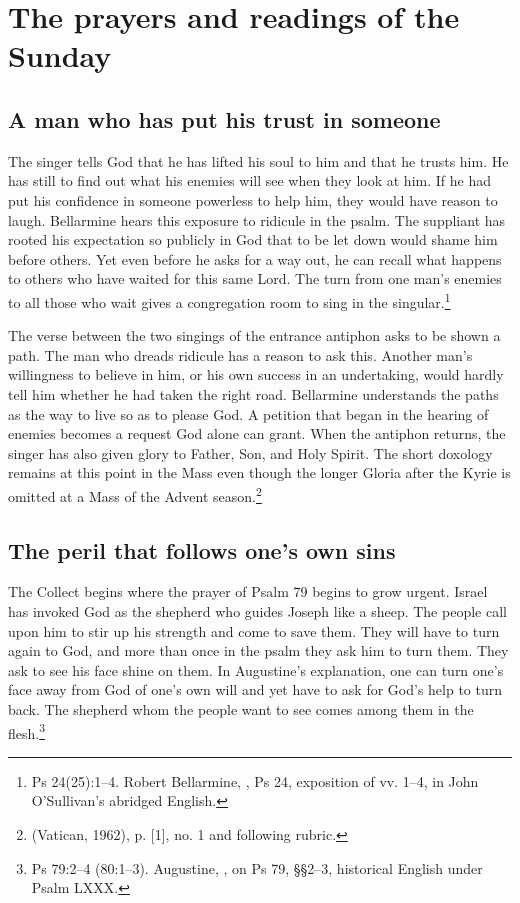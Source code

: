 \section{The prayers and readings of the Sunday}

\subsection{A man who has put his trust in someone}

The singer tells God that he has lifted his soul to him and that he trusts him. He has still to find out what his enemies will see when they look at him. If he had put his confidence in someone powerless to help him, they would have reason to laugh. Bellarmine hears this exposure to ridicule in the psalm. The suppliant has rooted his expectation so publicly in God that to be let down would shame him before others. Yet even before he asks for a way out, he can recall what happens to others who have waited for this same Lord. The turn from one man's enemies to all those who wait gives a congregation room to sing in the singular.\footnote{Ps 24(25):1--4. Robert Bellarmine, , Ps 24, exposition of vv. 1--4, in John O'Sullivan's abridged English.}

The verse between the two singings of the entrance antiphon asks to be shown a path. The man who dreads ridicule has a reason to ask this. Another man's willingness to believe in him, or his own success in an undertaking, would hardly tell him whether he had taken the right road. Bellarmine understands the paths as the way to live so as to please God. A petition that began in the hearing of enemies becomes a request God alone can grant. When the antiphon returns, the singer has also given glory to Father, Son, and Holy Spirit. The short doxology remains at this point in the Mass even though the longer Gloria after the Kyrie is omitted at a Mass of the Advent season.\footnote{ (Vatican, 1962), p. [1], no. 1 and following rubric.}

\subsection{The peril that follows one's own sins}

The Collect begins where the prayer of Psalm 79 begins to grow urgent. Israel has invoked God as the shepherd who guides Joseph like a sheep. The people call upon him to stir up his strength and come to save them. They will have to turn again to God, and more than once in the psalm they ask him to turn them. They ask to see his face shine on them. In Augustine's explanation, one can turn one's face away from God of one's own will and yet have to ask for God's help to turn back. The shepherd whom the people want to see comes among them in the flesh.\footnote{Ps 79:2--4 (80:1--3). Augustine, , on Ps 79, §§2--3, historical English under Psalm LXXX.}


